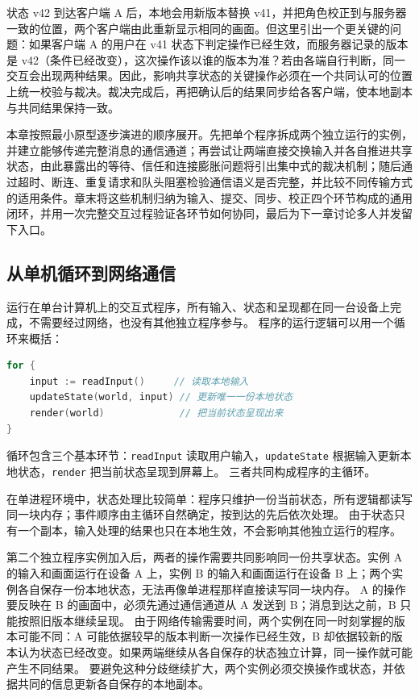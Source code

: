 状态 v42 到达客户端 A 后，本地会用新版本替换 v41，并把角色校正到与服务器一致的位置，两个客户端由此重新显示相同的画面。但这里引出一个更关键的问题：如果客户端 A 的用户在 v41 状态下判定操作已经生效，而服务器记录的版本是 v42（条件已经改变），这次操作该以谁的版本为准？若由各端自行判断，同一交互会出现两种结果。因此，影响共享状态的关键操作必须在一个共同认可的位置上统一校验与裁决。裁决完成后，再把确认后的结果同步给各客户端，使本地副本与共同结果保持一致。

本章按照最小原型逐步演进的顺序展开。先把单个程序拆成两个独立运行的实例，并建立能够传递完整消息的通信通道；再尝试让两端直接交换输入并各自推进共享状态，由此暴露出的等待、信任和连接膨胀问题将引出集中式的裁决机制；随后通过超时、断连、重复请求和队头阻塞检验通信语义是否完整，并比较不同传输方式的适用条件。章末将这些机制归纳为输入、提交、同步、校正四个环节构成的通用闭环，并用一次完整交互过程验证各环节如何协同，最后为下一章讨论多人并发留下入口。

\subsection{从单机循环到网络通信}\label{sec2:local-to-online}

运行在单台计算机上的交互式程序，所有输入、状态和呈现都在同一台设备上完成，不需要经过网络，也没有其他独立程序参与。
程序的运行逻辑可以用一个循环来概括：

\begin{tcolorbox}[title=单进程状态循环（概念示例）]
\begin{lstlisting}[style=codeblock, language=go]
for {
    input := readInput()     // 读取本地输入
    updateState(world, input) // 更新唯一一份本地状态
    render(world)             // 把当前状态呈现出来
}
\end{lstlisting}
\end{tcolorbox}

循环包含三个基本环节：\texttt{readInput} 读取用户输入，\texttt{updateState} 根据输入更新本地状态，\texttt{render} 把当前状态呈现到屏幕上。
三者共同构成程序的主循环。

在单进程环境中，状态处理比较简单：程序只维护一份当前状态，所有逻辑都读写同一块内存；事件顺序由主循环自然确定，按到达的先后依次处理。
由于状态只有一个副本，输入处理的结果也只在本地生效，不会影响其他独立运行的程序。

第二个独立程序实例加入后，两者的操作需要共同影响同一份共享状态。实例 A 的输入和画面运行在设备 A 上，实例 B 的输入和画面运行在设备 B 上；两个实例各自保存一份本地状态，无法再像单进程那样直接读写同一块内存。
A 的操作要反映在 B 的画面中，必须先通过通信通道从 A 发送到 B；消息到达之前，B 只能按照旧版本继续呈现。
由于网络传输需要时间，两个实例在同一时刻掌握的版本可能不同：A 可能依据较早的版本判断一次操作已经生效，B 却依据较新的版本认为状态已经改变。如果两端继续从各自保存的状态独立计算，同一操作就可能产生不同结果。
要避免这种分歧继续扩大，两个实例必须交换操作或状态，并依据共同的信息更新各自保存的本地副本。

